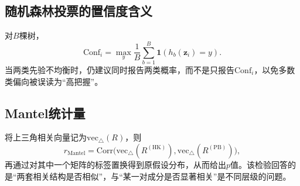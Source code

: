 \documentclass[UTF8,a4paper,12pt]{ctexart}
\begin{document}
\subsection{随机森林投票的置信度含义}
对$B$棵树，
\begin{equation}
\mathrm{Conf}_i=\max_y \frac{1}{B}\sum_{b=1}^{B}\mathbf{1}(h_b(\mathbf{z}_i)=y).
\end{equation}
当两类先验不均衡时，仍建议同时报告两类概率，而不是只报告$\mathrm{Conf}_i$，以免多数类偏向被误读为“高把握”。

\subsection{Mantel统计量}
将上三角相关向量记为$\mathrm{vec}_\triangle(R)$，则
\begin{equation}
r_{\mathrm{Mantel}}
=\mathrm{Corr}\big(\mathrm{vec}_\triangle(R^{(\mathrm{HK})}),\mathrm{vec}_\triangle(R^{(\mathrm{PB})})\big),
\end{equation}
再通过对其中一个矩阵的标签置换得到原假设分布，从而给出$p$值。该检验回答的是“两套相关结构是否相似”，与“某一对成分是否显著相关”是不同层级的问题。
\end{document}

